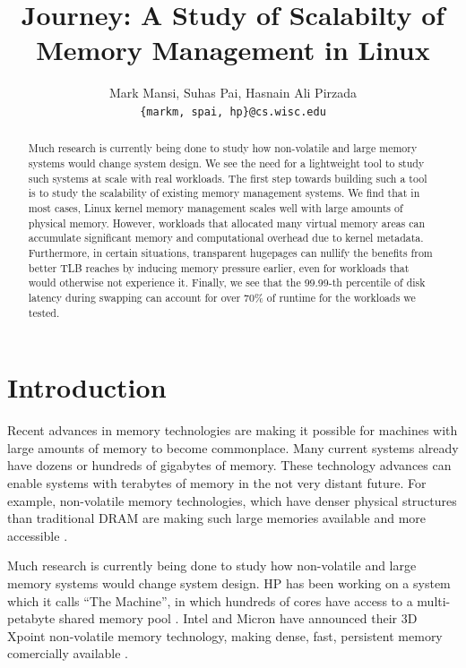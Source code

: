 \documentclass[twocolumn,11pt]{article}
\title{Journey: A Study of Scalabilty of Memory Management in Linux}
\author{Mark Mansi, Suhas Pai, Hasnain Ali Pirzada\\\texttt{\{markm, spai, hp\}@cs.wisc.edu}}
\date{}
\begin{document}
\maketitle

\begin{abstract}
    \small 

Much research is currently being done to study how non-volatile and large
memory systems would change system design.  We see the need for a lightweight
tool to study such systems at scale with real workloads.  The first step
towards building such a tool is to study the scalability of existing memory
management systems.  We find that in most cases, Linux kernel memory management
scales well with large amounts of physical memory. However, workloads that
allocated many virtual memory areas can accumulate significant memory and
computational overhead due to kernel metadata.     Furthermore, in certain
situations, transparent hugepages can nullify the benefits from better TLB
reaches by inducing memory pressure earlier, even for workloads that would
otherwise not experience it.  Finally, we see that the 99.99-th percentile of
disk latency during swapping can account for over 70\% of runtime for the
workloads we tested.

\end{abstract}

\section{Introduction}

Recent advances in memory technologies are making it possible for machines with
large amounts of memory to become commonplace. Many current systems already
have dozens or hundreds of gigabytes of memory. These technology advances can
enable systems with terabytes of memory in the not very distant future. For
example, non-volatile memory technologies, which have denser physical
structures than traditional DRAM are making such large memories available and
more accessible \cite{xpoint}.

Much research is currently being done to study how non-volatile and large
memory systems would change system design. HP has been working on a system
which it calls ``The Machine'', in which hundreds of cores have access to a
multi-petabyte shared memory pool \cite{hp_machine}. Intel and
Micron have announced their 3D Xpoint non-volatile memory technology, making
dense, fast, persistent memory comercially available \cite{xpoint}.
\end{document}

